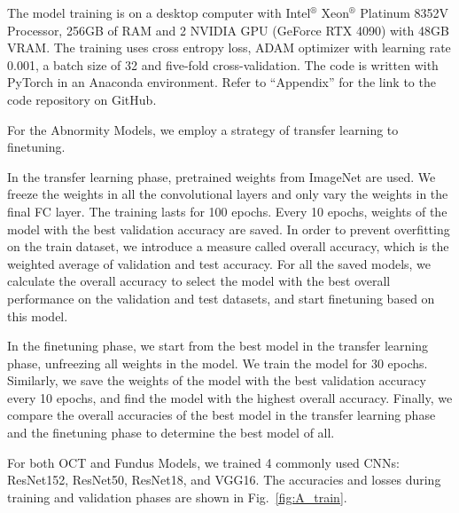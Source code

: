 \documentclass{article}
\begin{document}
	The model training is on a desktop computer with Intel$^®$ Xeon$^®$ Platinum 8352V Processor, 256GB of RAM and 2 NVIDIA GPU (GeForce RTX 4090) with 48GB VRAM. The training uses cross entropy loss, ADAM optimizer with learning rate 0.001, a batch size of 32 and five-fold cross-validation. The code is written with PyTorch in an Anaconda environment. Refer to ``Appendix'' for the link to the code repository on GitHub. 
	
	\vspace{0.3cm}
	
	For the Abnormity Models, we employ a strategy of transfer learning to finetuning. 
	
	In the transfer learning phase, pretrained weights from ImageNet \autocite{Krizhevsky_Sutskever_Hinton_2017} are used. We freeze the weights in all the convolutional layers and only vary the weights in the final FC layer. The training lasts for 100 epochs. Every 10 epochs, weights of the model with the best validation accuracy are saved. In order to prevent overfitting on the train dataset, we introduce a measure called overall accuracy, which is the weighted average of validation and test accuracy. For all the saved models, we calculate the overall accuracy to select the model with the best overall performance on the validation and test datasets, and start finetuning based on this model. 
	
	In the finetuning phase, we start from the best model in the transfer learning phase, unfreezing all weights in the model. We train the model for 30 epochs. Similarly, we save the weights of the model with the best validation accuracy every 10 epochs, and find the model with the highest overall accuracy. Finally, we compare the overall accuracies of the best model in the transfer learning phase and the finetuning phase to determine the best model of all. 
	
	For both OCT and Fundus Models, we trained 4 commonly used CNNs: ResNet152, ResNet50, ResNet18, and VGG16. The accuracies and losses during training and validation phases are shown in Fig.~\ref{fig:A_train}. 
	
\end{document}
